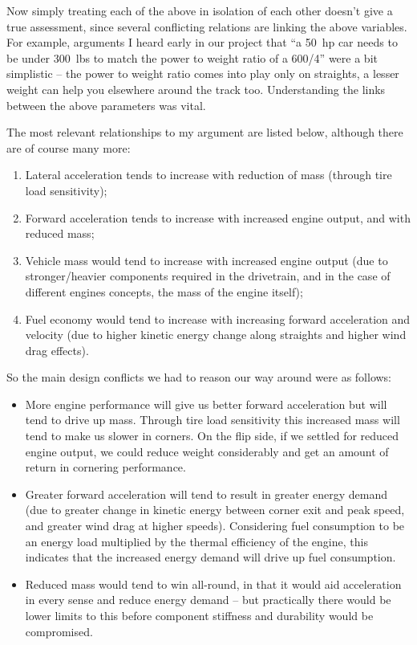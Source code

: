 \documentclass[10pt, a4paper, article, oneside, twocolumn, final]{memoir}
\begin{document}
Now simply treating each of the above in isolation of each other doesn’t give a true assessment, since several conflicting relations are linking the above variables. For example, arguments I heard early in our project that “a \SI{50}{hp} car needs to be under \SI{300}{lbs} to match the power to weight ratio of a \num{600/4}” were a bit simplistic -- the power to weight ratio comes into play only on straights, a lesser weight can help you elsewhere around the track too. Understanding the links between the above parameters was vital. 

The most relevant relationships to my argument are listed below, although there are of course many more: 

\begin{enumerate}
    \item Lateral acceleration tends to increase with reduction of mass (through tire load sensitivity);
    \item Forward acceleration tends to increase with increased engine output, and with reduced mass; 
    \item Vehicle mass would tend to increase with increased engine output (due to stronger/\allowbreak heavier components required in the drivetrain, and in the case of different engines concepts, the mass of the engine itself);
    \item Fuel economy would tend to increase with increasing forward acceleration and velocity (due to higher kinetic energy change along straights and higher wind drag effects).
\end{enumerate}

So the main design conflicts we had to reason our way around were as follows: 

\begin{itemize}
    \item More engine performance will give us better forward acceleration but will tend to drive up mass. Through tire load sensitivity this increased mass will tend to make us slower in corners. On the flip side, if we settled for reduced engine output, we could reduce weight considerably and get an amount of return in cornering performance.
    \item Greater forward acceleration will tend to result in greater energy demand (due to greater change in kinetic energy between corner exit and peak speed, and greater wind drag at higher speeds). Considering fuel consumption to be an energy load multiplied by the thermal efficiency of the engine, this indicates that the increased energy demand will drive up fuel consumption.
    \item Reduced mass would tend to win all-round, in that it would aid acceleration in every sense and reduce energy demand -- but practically there would be lower limits to this before component stiffness and durability would be compromised.
\end{itemize}
\end{document}
